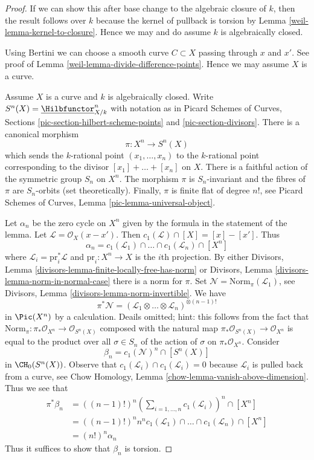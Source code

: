 \begin{proof}

If we can show this after base change to the algebraic closure of $k$,
then the result follows over $k$ because the kernel of pullback
is torsion by Lemma \ref{weil-lemma-kernel-to-closure}.
Hence we may and do assume $k$ is algebraically closed.

\medskip\noindent
Using Bertini we can choose a smooth curve $C \subset X$ passing through
$x$ and $x'$. See proof of Lemma \ref{weil-lemma-divide-difference-points}.
Hence we may assume $X$ is a curve.

\medskip\noindent
Assume $X$ is a curve and $k$ is algebraically closed.
Write $S^n(X) = \underline{\Hilbfunctor}^n_{X/k}$ with notation as in
Picard Schemes of Curves, Sections \ref{pic-section-hilbert-scheme-points}
and \ref{pic-section-divisors}. There is a canonical morphism
$$
\pi : X^n \longrightarrow S^n(X)
$$
which sends the $k$-rational point $(x_1, \ldots, x_n)$ to the $k$-rational
point corresponding to the divisor $[x_1] + \ldots + [x_n]$ on $X$.
There is a faithful action of the symmetric group $S_n$ on $X^n$.
The morphism $\pi$ is $S_n$-invariant and the fibres of $\pi$ are
$S_n$-orbits (set theoretically). Finally, $\pi$ is finite flat of
degree $n!$, see Picard Schemes of Curves, Lemma
\ref{pic-lemma-universal-object}.

\medskip\noindent
Let $\alpha_n$ be the zero cycle on $X^n$ given by the formula in the
statement of the lemma. Let $\mathcal{L} = \mathcal{O}_X(x - x')$. Then
$c_1(\mathcal{L}) \cap [X] = [x] - [x']$. Thus
$$
\alpha_n = c_1(\mathcal{L}_1) \cap \ldots \cap c_1(\mathcal{L}_n) \cap [X^n]
$$
where $\mathcal{L}_i = \text{pr}_i^*\mathcal{L}$ and $\text{pr}_i : X^n \to X$
is the $i$th projection. By either
Divisors, Lemma \ref{divisors-lemma-finite-locally-free-has-norm} or
Divisors, Lemma \ref{divisors-lemma-norm-in-normal-case}
there is a norm for $\pi$. Set
$\mathcal{N} = \text{Norm}_\pi(\mathcal{L}_1)$,
see Divisors, Lemma \ref{divisors-lemma-norm-invertible}. We have
$$
\pi^*\mathcal{N} =
(\mathcal{L}_1 \otimes \ldots \otimes \mathcal{L}_n)^{\otimes (n - 1)!}
$$
in $\Pic(X^n)$ by a calculation. Deails omitted; hint: this follows from
the fact that
$\text{Norm}_\pi : \pi_*\mathcal{O}_{X^n} \to \mathcal{O}_{S^n(X)}$
composed with the natural map $\pi_*\mathcal{O}_{S^n(X)} \to \mathcal{O}_{X^n}$
is equal to the product over all $\sigma \in S_n$ of the action of
$\sigma$ on $\pi_*\mathcal{O}_{X^n}$. Consider
$$
\beta_n = c_1(\mathcal{N})^n \cap [S^n(X)]
$$
in $\CH_0(S^n(X))$. Observe that
$c_1(\mathcal{L}_i) \cap c_1(\mathcal{L}_i) = 0$
because $\mathcal{L}_i$ is pulled back from a curve, see
Chow Homology, Lemma \ref{chow-lemma-vanish-above-dimension}. Thus we see that
\begin{align*}
\pi^*\beta_n
& =
((n - 1)!)^n
(\sum\nolimits_{i = 1, \ldots, n} c_1(\mathcal{L}_i))^n \cap [X^n] \\
& =
((n - 1)!)^n n^n
c_1(\mathcal{L}_1) \cap \ldots \cap c_1(\mathcal{L}_n) \cap [X^n] \\
& =
(n!)^n \alpha_n
\end{align*}
Thus it suffices to show that $\beta_n$ is torsion.


\end{proof}
